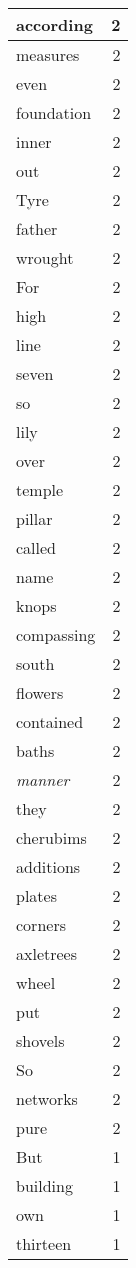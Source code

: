\begin{center}
\begin{longtable}{l|r}
according & 2 \\ \hline
measures & 2 \\ \hline
even & 2 \\ \hline
foundation & 2 \\ \hline
inner & 2 \\ \hline
out & 2 \\ \hline
Tyre & 2 \\ \hline
father & 2 \\ \hline
wrought & 2 \\ \hline
For & 2 \\ \hline
high & 2 \\ \hline
line & 2 \\ \hline
seven & 2 \\ \hline
so & 2 \\ \hline
lily & 2 \\ \hline
over & 2 \\ \hline
temple & 2 \\ \hline
pillar & 2 \\ \hline
called & 2 \\ \hline
name & 2 \\ \hline
knops & 2 \\ \hline
compassing & 2 \\ \hline
south & 2 \\ \hline
flowers & 2 \\ \hline
contained & 2 \\ \hline
baths & 2 \\ \hline
\emph{manner} & 2 \\ \hline
they & 2 \\ \hline
cherubims & 2 \\ \hline
additions & 2 \\ \hline
plates & 2 \\ \hline
corners & 2 \\ \hline
axletrees & 2 \\ \hline
wheel & 2 \\ \hline
put & 2 \\ \hline
shovels & 2 \\ \hline
So & 2 \\ \hline
networks & 2 \\ \hline
pure & 2 \\ \hline
But & 1 \\ \hline
building & 1 \\ \hline
own & 1 \\ \hline
thirteen & 1 \\ \hline

\end{longtable}
\end{center}
